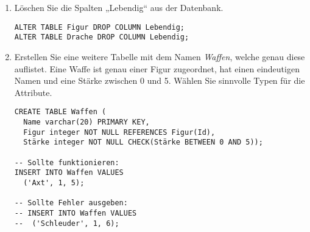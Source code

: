 \documentclass{lehramt-informatik-aufgabe}
\begin{document}
\begin{enumerate}
%

\item Löschen Sie die Spalten „Lebendig“ aus der Datenbank.

\begin{antwort}
\begin{verbatim}
ALTER TABLE Figur DROP COLUMN Lebendig;
ALTER TABLE Drache DROP COLUMN Lebendig;
\end{verbatim}
\end{antwort}

%

\item Erstellen Sie eine weitere Tabelle mit dem Namen \emph{Waffen},
welche genau diese auflistet. Eine Waffe ist genau einer Figur
zugeordnet, hat einen eindeutigen Namen und eine Stärke zwischen 0 und
5. Wählen Sie sinnvolle Typen für die Attribute.

\begin{verbatim}
CREATE TABLE Waffen (
  Name varchar(20) PRIMARY KEY,
  Figur integer NOT NULL REFERENCES Figur(Id),
  Stärke integer NOT NULL CHECK(Stärke BETWEEN 0 AND 5));

-- Sollte funktionieren:
INSERT INTO Waffen VALUES
  ('Axt', 1, 5);

-- Sollte Fehler ausgeben:
-- INSERT INTO Waffen VALUES
--  ('Schleuder', 1, 6);
\end{verbatim}
\end{enumerate}
\end{document}
